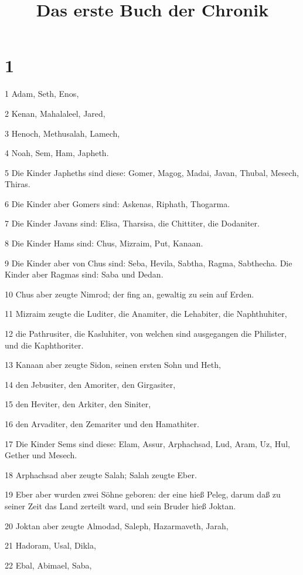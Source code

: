 

\title{Das erste Buch der Chronik}


\chapter{1}

\par 1 Adam, Seth, Enos,
\par 2 Kenan, Mahalaleel, Jared,
\par 3 Henoch, Methusalah, Lamech,
\par 4 Noah, Sem, Ham, Japheth.
\par 5 Die Kinder Japheths sind diese: Gomer, Magog, Madai, Javan, Thubal, Mesech, Thiras.
\par 6 Die Kinder aber Gomers sind: Askenas, Riphath, Thogarma.
\par 7 Die Kinder Javans sind: Elisa, Tharsisa, die Chittiter, die Dodaniter.
\par 8 Die Kinder Hams sind: Chus, Mizraim, Put, Kanaan.
\par 9 Die Kinder aber von Chus sind: Seba, Hevila, Sabtha, Ragma, Sabthecha. Die Kinder aber Ragmas sind: Saba und Dedan.
\par 10 Chus aber zeugte Nimrod; der fing an, gewaltig zu sein auf Erden.
\par 11 Mizraim zeugte die Luditer, die Anamiter, die Lehabiter, die Naphthuhiter,
\par 12 die Pathrusiter, die Kasluhiter, von welchen sind ausgegangen die Philister, und die Kaphthoriter.
\par 13 Kanaan aber zeugte Sidon, seinen ersten Sohn und Heth,
\par 14 den Jebusiter, den Amoriter, den Girgasiter,
\par 15 den Heviter, den Arkiter, den Siniter,
\par 16 den Arvaditer, den Zemariter und den Hamathiter.
\par 17 Die Kinder Sems sind diese: Elam, Assur, Arphachsad, Lud, Aram, Uz, Hul, Gether und Mesech.
\par 18 Arphachsad aber zeugte Salah; Salah zeugte Eber.
\par 19 Eber aber wurden zwei Söhne geboren: der eine hieß Peleg, darum daß zu seiner Zeit das Land zerteilt ward, und sein Bruder hieß Joktan.
\par 20 Joktan aber zeugte Almodad, Saleph, Hazarmaveth, Jarah,
\par 21 Hadoram, Usal, Dikla,
\par 22 Ebal, Abimael, Saba,
